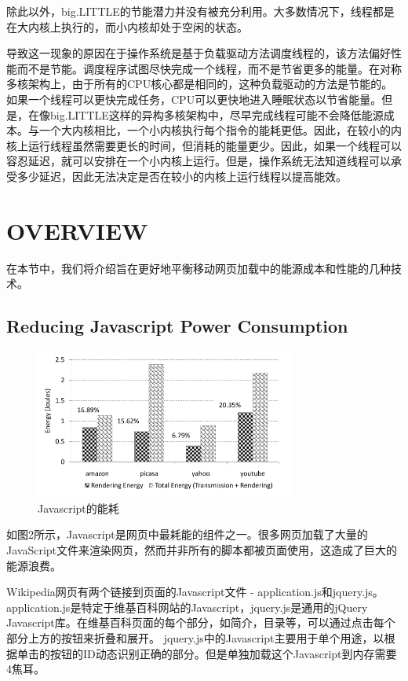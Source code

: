 \documentclass{sig-alternate-05-2015}
\begin{document}
除此以外，big.LITTLE的节能潜力并没有被充分利用。大多数情况下，线程都是在大内核上执行的，而小内核却处于空闲的状态。

导致这一现象的原因在于操作系统是基于负载驱动方法调度线程的，该方法偏好性能而不是节能。调度程序试图尽快完成一个线程，而不是节省更多的能量。在对称多核架构上，由于所有的CPU核心都是相同的，这种负载驱动的方法是节能的。如果一个线程可以更快完成任务，CPU可以更快地进入睡眠状态以节省能量。\cite{7}但是，在像big.LITTLE这样的异构多核架构中，尽早完成线程可能不会降低能源成本。与一个大内核相比，一个小内核执行每个指令的能耗更低。因此，在较小的内核上运行线程虽然需要更长的时间，但消耗的能量更少。因此，如果一个线程可以容忍延迟，就可以安排在一个小内核上运行。但是，操作系统无法知道线程可以承受多少延迟，因此无法决定是否在较小的内核上运行线程以提高能效。

\section{OVERVIEW}

在本节中，我们将介绍旨在更好地平衡移动网页加载中的能源成本和性能的几种技术。

\subsection{Reducing Javascript Power Consumption}

\begin{figure}[htbp]
	\centering
	\includegraphics[width=3.4in]{./figure2}
	\caption{Javascript的能耗}\label{fig:tasks}
\end{figure}


如图2所示\cite{13}，Javascript是网页中最耗能的组件之一。很多网页加载了大量的JavaScript文件来渲染网页，然而并非所有的脚本都被页面使用，这造成了巨大的能源浪费。

Wikipedia网页有两个链接到页面的Javascript文件 - application.js和jquery.js。 application.js是特定于维基百科网站的Javascript，jquery.js是通用的jQuery Javascript库。在维基百科页面的每个部分，如简介，目录等，可以通过点击每个部分上方的按钮来折叠和展开。 jquery.js中的Javascript主要用于单个用途，以根据单击的按钮的ID动态识别正确的部分。但是单独加载这个Javascript到内存需要4焦耳。
\end{document}
